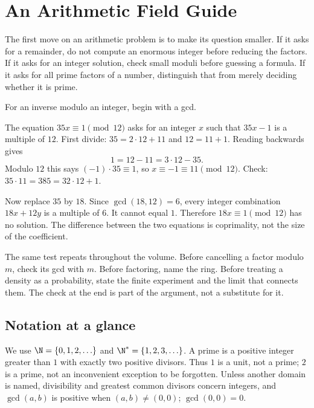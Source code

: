 \chapter*{An Arithmetic Field Guide}

The first move on an arithmetic problem is to make its question smaller.
If it asks for a remainder, do not compute an enormous integer before
reducing the factors. If it asks for an integer solution, check small
moduli before guessing a formula. If it asks for all prime factors of
a number, distinguish that from merely deciding whether it is prime.

For an inverse modulo an integer, begin with a gcd.

\begin{examplex}
The equation $35x\equiv1\pmod{12}$ asks for an integer $x$ such that
$35x-1$ is a multiple of $12$. First divide: $35=2\cdot12+11$ and
$12=11+1$. Reading backwards gives
\[
1=12-11=3\cdot12-35.
\]
Modulo $12$ this says $(-1)\cdot35\equiv1$, so
$x\equiv-1\equiv11\pmod{12}$. Check:
$35\cdot11=385=32\cdot12+1$.

Now replace $35$ by $18$. Since $\gcd(18,12)=6$,
every integer combination $18x+12y$ is a multiple of $6$.
It cannot equal $1$. Therefore $18x\equiv1\pmod{12}$
has no solution. The difference between the two equations is
coprimality, not the size of the coefficient.
\end{examplex}

The same test repeats throughout the volume. Before cancelling a factor modulo $m$,
check its gcd with $m$. Before factoring, name the ring. Before treating
a density as a probability, state the finite experiment and the
limit that connects them. The check at the end is part of the
argument, not a substitute for it.

\section*{Notation at a glance}
We use $\N=\{0,1,2,\ldots\}$ and $\N^*=\{1,2,3,\ldots\}$. A prime is a positive integer greater than $1$
with exactly two positive divisors. Thus $1$ is a unit, not a prime; $2$ is a prime, not an inconvenient exception
to be forgotten. Unless another domain is named, divisibility and greatest common divisors concern integers,
and $\gcd(a,b)$ is positive when $(a,b)\ne(0,0)$; $\gcd(0,0)=0$.

